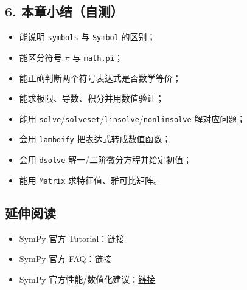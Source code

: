 \subsection{6.
本章小结（自测）}\label{ux672cux7ae0ux5c0fux7ed3ux81eaux6d4b-1}

\begin{itemize}
\tightlist
\item[$\square$]
  能说明 \texttt{symbols} 与 \texttt{Symbol} 的区别；
\item[$\square$]
  能区分符号 \(\pi\) 与 \texttt{math.pi}；
\item[$\square$]
  能正确判断两个符号表达式是否数学等价；
\item[$\square$]
  能求极限、导数、积分并用数值验证；
\item[$\square$]
  能用
  \texttt{solve}/\texttt{solveset}/\texttt{linsolve}/\texttt{nonlinsolve}
  解对应问题；
\item[$\square$]
  会用 \texttt{lambdify} 把表达式转成数值函数；
\item[$\square$]
  会用 \texttt{dsolve} 解一/二阶微分方程并给定初值；
\item[$\square$]
  能用 \texttt{Matrix} 求特征值、雅可比矩阵。
\end{itemize}

\subsection{延伸阅读}\label{ux5ef6ux4f38ux9605ux8bfb-9}

\begin{itemize}
\tightlist
\item
  SymPy 官方
  Tutorial：\href{https://docs.sympy.org/latest/tutorial/index.html}{链接}
\item
  SymPy 官方
  FAQ：\href{https://docs.sympy.org/latest/tutorial/gotchas.html}{链接}
\item
  SymPy
  官方性能/数值化建议：\href{https://docs.sympy.org/latest/modules/utilities/lambdify.html}{链接}
\end{itemize}

\newpage
